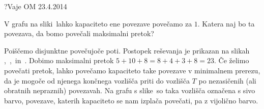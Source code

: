\begin{naloga}{?}{Vaje OM 23.4.2014}
\begin{vprasanje}
V grafu na sliki~\fig lahko kapaciteto ene povezave povečamo za $1$.
Katera naj bo ta povezava, da bomo povečali maksimalni pretok?

\begin{slika}
\pgfslika
{}
\end{slika}
\end{vprasanje}

\begin{odgovor}
Poiščemo disjunktne povečujoče poti.
Postopek reševanja je prikazan na slikah~%
\fig[pretok4a],~\fig[pretok4b],~\fig[pretok4c] in~\fig[pretok4d].
Dobimo maksimalni pretok $5+10+8 = 8+4+3+8 = 23$.
Če želimo povečati pretok,
lahko povečamo kapaciteto take povezave v minimalnem prerezu,
da je mogoče od njenega končnega vozlišča priti do vozlišča $T$
po nezasičenih (ali obratnih nepraznih) povezavah.
Na grafu s slike~\fig[pretok4d]
so taka vozlišča označena s sivo barvo,
povezave, katerih kapaciteto se nam izplača povečati, pa z vijolično barvo.

\begin{slika}
\pgfslika[pretok4a]
\end{slika}
\begin{slika}
\pgfslika[pretok4b]
\end{slika}
\begin{slika}
\pgfslika[pretok4c]
\end{slika}
\begin{slika}
\pgfslika[pretok4d]
\end{slika}
\end{odgovor}
\end{naloga}
